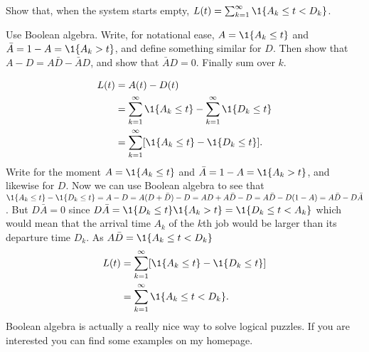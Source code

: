 \begin{exercise}
  Show that, when the system starts empty, $L(t) = \sum_{k=1}^\infty \1{A_k \leq t < D_k}$.
  \begin{hint}
    Use Boolean algebra.
    Write, for notational ease, $A=\1{A_k \leq t}$ and $\bar A = 1- A = \1{A_k > t}$, and define something similar for $D$.
    Then show that $A - D = A \bar D - \bar A D$, and show that $\bar A D =0$.
    Finally sum over $k$.
  \end{hint}

\begin{solution}
  \begin{equation*}
    \begin{split}
      L(t)
&= A(t) - D(t) \\
&= \sum_{k=1}^\infty \1{A_k \leq t} -  \sum_{k=1}^\infty \1{D_k \leq t} \\
&= \sum_{k=1}^\infty [\1{A_k \leq t} -  \1{D_k \leq t}].
    \end{split}
  \end{equation*}
  Write for the moment $A=\1{A_k \leq t}$ and
  $\bar A = 1- A = \1{A_k > t}$, and likewise for $D$. Now we can use
  Boolean algebra to see that
  $\1{A_k \leq t} - \1{D_k \leq t} = A-D = A(D+\bar D) -D = AD +
  A\bar D - D = A\bar D - D(1-A) = A\bar D - D \bar A$.
  But $D \bar A = 0$ since
  $D \bar A = \1{D_k \leq t} \1{A_k > t} = \1{D_k \leq t < A_k}$
  which would mean that the arrival time $A_k$ of the $k$th job would
  be larger than its departure time $D_k$. As $A \bar D = \1{A_k \leq t < D_k}$
  \begin{equation*}
    \begin{split}
      L(t)
&= \sum_{k=1}^\infty [\1{A_k \leq t} -  \1{D_k \leq t}] \\
&= \sum_{k=1}^\infty \1{A_k \leq t < D_k}.
    \end{split}
  \end{equation*}
  Boolean algebra is actually a really nice way to solve logical puzzles.
  If you are interested you can find some examples on my homepage.
\end{solution}

\end{exercise}

